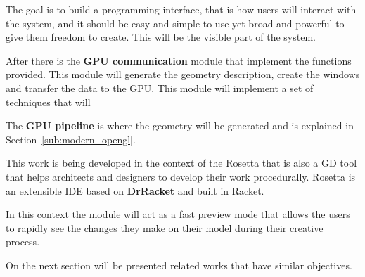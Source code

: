 The goal is to build a programming interface, that is how users will interact with the system, and it should be easy and simple to use yet broad and powerful to give them freedom to create. This will be the visible part of the system. 

After there is the \textbf{GPU communication} module that implement the functions provided. This module will generate the geometry description, create the windows and transfer the data to the GPU. This module will implement a set of techniques that will 

The \textbf{GPU pipeline} is where the geometry will be generated and is explained in Section~\ref{sub:modern_opengl}.


This work is being developed in the context of the Rosetta that is also a GD tool that helps architects and designers to develop their work procedurally. Rosetta is an extensible IDE based on \textbf{DrRacket} and built in Racket. 

In this context the module will act as a fast preview mode that allows the users to rapidly see the changes they make on their model during their creative process.

On the next section will be presented related works that have similar objectives.



